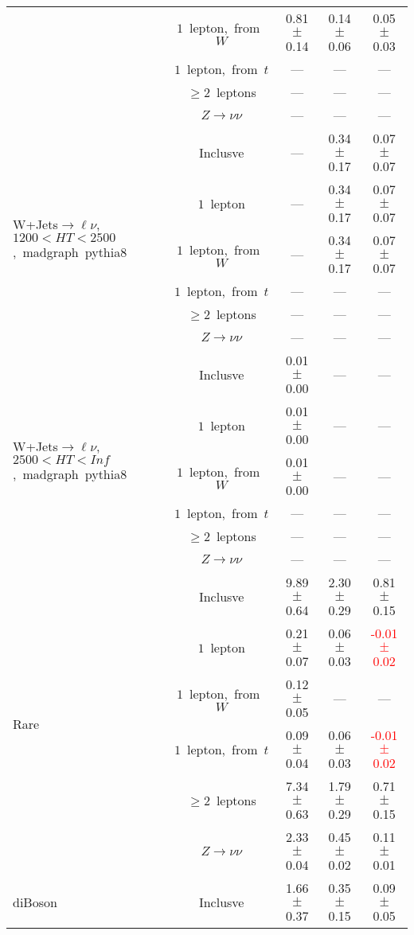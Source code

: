 \documentclass{article}
\begin{document}
\begin{longtable}{|l|c|c|c|c|}
 & $1$~lepton,~from~$W$  & 0.81 $\pm$ 0.14  & 0.14 $\pm$ 0.06  & 0.05 $\pm$ 0.03 \\* 
 & $1$~lepton,~from~$t$  & ---  & ---  & --- \\* 
 & $\ge2$~leptons  & ---  & ---  & --- \\* 
 & $Z\rightarrow\nu\nu$  & ---  & ---  & --- \\* 
\hline 
\multirow{6}{*}{W+Jets$\rightarrow\ell\nu$,~$1200<HT<2500$,~madgraph~pythia8} & Inclusve  & ---  & 0.34 $\pm$ 0.17  & 0.07 $\pm$ 0.07 \\* 
 & $1$~lepton  & ---  & 0.34 $\pm$ 0.17  & 0.07 $\pm$ 0.07 \\* 
 & $1$~lepton,~from~$W$  & ---  & 0.34 $\pm$ 0.17  & 0.07 $\pm$ 0.07 \\* 
 & $1$~lepton,~from~$t$  & ---  & ---  & --- \\* 
 & $\ge2$~leptons  & ---  & ---  & --- \\* 
 & $Z\rightarrow\nu\nu$  & ---  & ---  & --- \\* 
\hline 
\multirow{6}{*}{W+Jets$\rightarrow\ell\nu$,~$2500<HT<Inf$,~madgraph~pythia8} & Inclusve  & 0.01 $\pm$ 0.00  & ---  & --- \\* 
 & $1$~lepton  & 0.01 $\pm$ 0.00  & ---  & --- \\* 
 & $1$~lepton,~from~$W$  & 0.01 $\pm$ 0.00  & ---  & --- \\* 
 & $1$~lepton,~from~$t$  & ---  & ---  & --- \\* 
 & $\ge2$~leptons  & ---  & ---  & --- \\* 
 & $Z\rightarrow\nu\nu$  & ---  & ---  & --- \\* 
\hline 
\multirow{6}{*}{Rare} & Inclusve  & 9.89 $\pm$ 0.64  & 2.30 $\pm$ 0.29  & 0.81 $\pm$ 0.15 \\* 
 & $1$~lepton  & 0.21 $\pm$ 0.07  & 0.06 $\pm$ 0.03  & \textcolor{red}{ -0.01 $\pm$ 0.02 } \\* 
 & $1$~lepton,~from~$W$  & 0.12 $\pm$ 0.05  & ---  & --- \\* 
 & $1$~lepton,~from~$t$  & 0.09 $\pm$ 0.04  & 0.06 $\pm$ 0.03  & \textcolor{red}{ -0.01 $\pm$ 0.02 } \\* 
 & $\ge2$~leptons  & 7.34 $\pm$ 0.63  & 1.79 $\pm$ 0.29  & 0.71 $\pm$ 0.15 \\* 
 & $Z\rightarrow\nu\nu$  & 2.33 $\pm$ 0.04  & 0.45 $\pm$ 0.02  & 0.11 $\pm$ 0.01 \\* 
\hline 
\multirow{6}{*}{diBoson} & Inclusve  & 1.66 $\pm$ 0.37  & 0.35 $\pm$ 0.15  & 0.09 $\pm$ 0.05 \\* 

\end{longtable}
\end{document}
